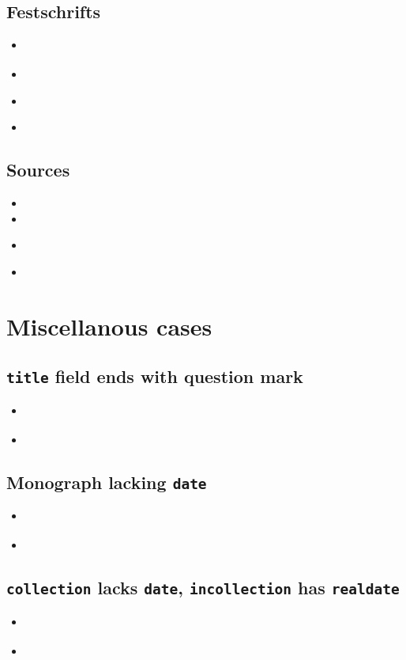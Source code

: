 \documentclass[a4paper,12pt]{scrartcl}
\newcommand{\Typ}[1]{\texttt{\symbol{64}#1}}
\newcommand{\Feld}[1]{\texttt{#1}}
\begin{document}
\subsection{Festschrifts}
\begin{itemize}
	\item\cite{kronsbein:siepen:2015}%
	\item{}%
    \item\cites{auler:hiller:2015a}%
    \item{}%
\end{itemize}

\subsection{Sources}
\begin{itemize}
	\item{}
	\item{}
    \item\cites{test::source}%
    \item{}%
\end{itemize}

\section{Miscellanous cases}

\subsection{\Feld{title} field ends with question mark}
\begin{itemize}
    \item\cite{edenmo:1997}%
	\item{}
\end{itemize}

\subsection{Monograph lacking \Feld{date}}
\begin{itemize}
	\item\cite{siebert:u:et:al:o:j}%
	\item{}%
\end{itemize}

\subsection{\Typ{collection} lacks \Feld{date}, \Typ{incollection} has \Feld{realdate}}
\begin{itemize}
	\item\cite{huet:o:j}%
	\item{}%
\end{itemize}
\end{document}
